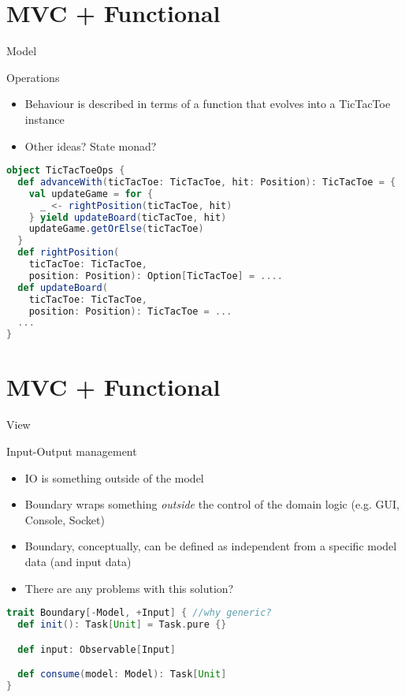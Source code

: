 \documentclass[presentation]{beamer}
\begin{document}
\section{MVC + Functional}
\begin{frame}[fragile]{Model}

\begin{block}{Operations}
\begin{itemize}
  \item Behaviour is described in terms of a function that evolves into a TicTacToe instance
  \item Other ideas? State monad?
\end{itemize}
\end{block}

\begin{lstlisting}[language=scala]
object TicTacToeOps {
  def advanceWith(ticTacToe: TicTacToe, hit: Position): TicTacToe = {
    val updateGame = for {
      _ <- rightPosition(ticTacToe, hit)
    } yield updateBoard(ticTacToe, hit)
    updateGame.getOrElse(ticTacToe)
  }
  def rightPosition(
    ticTacToe: TicTacToe, 
    position: Position): Option[TicTacToe] = ....
  def updateBoard(
    ticTacToe: TicTacToe, 
    position: Position): TicTacToe = ...
  ...
}
\end{lstlisting}

\end{frame}

\section{MVC + Functional}
\begin{frame}[fragile]{View}

\begin{block}{Input-Output management}
\begin{itemize}
  \item IO is something outside of the model
  \item Boundary wraps something \emph{outside} the control of the domain logic (e.g. GUI, Console, Socket) 
  \item Boundary, conceptually, can be defined as independent from a specific model data (and input data)
  \item There are any problems with this solution?
\end{itemize}
\end{block}

\begin{lstlisting}[language=scala]
trait Boundary[-Model, +Input] { //why generic?
  def init(): Task[Unit] = Task.pure {}

  def input: Observable[Input]

  def consume(model: Model): Task[Unit]
}
\end{lstlisting}

\end{frame}
\end{document}
